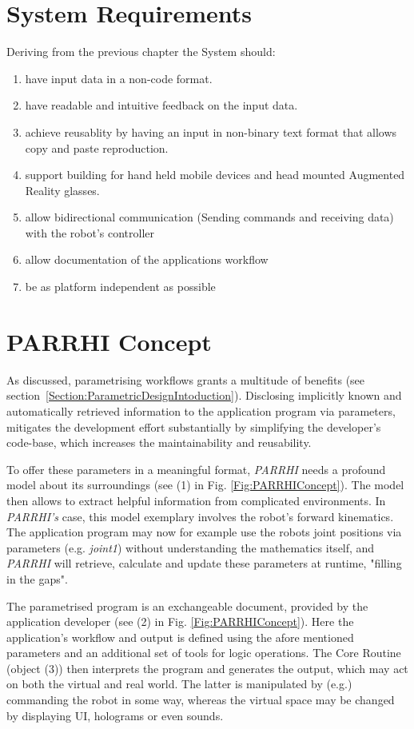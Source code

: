 \section{System Requirements}\label{Section:SystemRequirements}
Deriving from the previous chapter the System should:
\begin{enumerate}
	\setlength\itemsep{-1em}
	\item have input data in a non-code format.
	\item have readable and intuitive feedback on the input data.
	\item achieve reusablity by having an input in non-binary text format that allows copy and paste reproduction.
	\item support building for hand held mobile devices and head mounted Augmented Reality glasses.
	\item allow bidirectional communication (Sending commands and receiving data) with the robot's controller 
	\item allow documentation of the applications workflow
	\item be as platform independent as possible
\end{enumerate}

\clearpage
\section{PARRHI Concept}
As discussed, parametrising workflows grants a multitude of benefits (see section~\ref{Section:ParametricDesignIntoduction}). Disclosing implicitly known and automatically retrieved information to the application program via parameters, mitigates the development effort substantially by simplifying the developer's code-base, which increases the maintainability and reusability. 

To offer these parameters in a meaningful format, \textit{PARRHI} needs a profound model about its surroundings (see (1) in Fig. \ref{Fig:PARRHIConcept}). The model then allows to extract helpful information from complicated environments. In \textit{PARRHI's} case, this model exemplary involves the robot's forward kinematics. The application program may now for example use the robots joint positions via parameters (e.g. \textit{joint1}) without understanding the mathematics itself, and \textit{PARRHI} will retrieve, calculate and update these parameters at runtime, "filling in the gaps".

The parametrised program is an exchangeable document, provided by the application developer (see (2) in Fig. \ref{Fig:PARRHIConcept}). Here the application's workflow and output is defined using the afore mentioned parameters and an additional set of tools for logic operations. The Core Routine (object (3)) then interprets the program and generates the output, which may act on both the virtual and real world. The latter is manipulated by (e.g.) commanding the robot in some way, whereas the virtual space may be changed by displaying UI, holograms or even sounds. 

